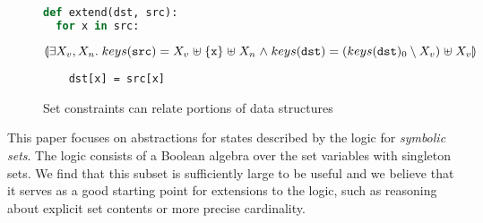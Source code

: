\begin{figure}[tb]
  \begin{center}
    \begin{lstlisting}[language=python]
def extend(dst, src):
  for x in src:
    \end{lstlisting}
    \qquad \qquad
    \(
    \llparenthesis 
      \exists X_v, X_n. \; keys(\texttt{src})
      = X_v \mathrel{\uplus} \{\texttt{x}\} \mathrel{\uplus} X_n \mathrel{\wedge} keys(\texttt{dst})
      = (keys(\texttt{dst})_0 \setminus X_v) \mathrel{\uplus} X_v
     \rrparenthesis
    \)
    \begin{lstlisting}
    dst[x] = src[x]
    \end{lstlisting}
  \end{center}
  \caption{Set constraints can relate portions of data structures}
  \label{fig:intro-example} \label{f:1:intro}
\end{figure}

This paper focuses on abstractions for states described by the logic for \emph{symbolic sets}.  The logic consists of a Boolean algebra over the set variables with singleton sets. We find that this subset is sufficiently large to be useful and we
believe that it serves as a good starting point for extensions to the
logic, such as reasoning about explicit set contents or more precise
cardinality.

